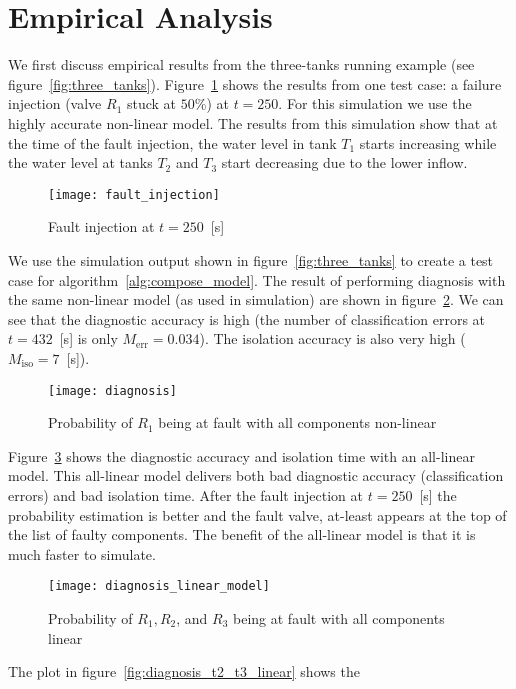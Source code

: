 \section{Empirical Analysis}
%
We first discuss empirical results from the three-tanks running
example (see
figure~\ref{fig:three_tanks}). Figure~\ref{fig:fault_injection} shows
the results from one test case: a failure injection (valve $R_1$ stuck
at $50$\%) at $t = 250$. For this simulation we use the highly accurate
non-linear model. The results from this simulation show that at the
time of the fault injection, the water level in tank $T_1$ starts
increasing while the water level at tanks $T_2$ and $T_3$ start
decreasing due to the lower inflow.
%
\begin{figure}[htb]
  \centering
  \texttt{[image: fault\_injection]}
  \caption{Fault injection at $t = 250$~[s]}
  \label{fig:fault_injection}
\end{figure}
\par
%
We use the simulation output shown in figure~\ref{fig:three_tanks} to
create a test case for algorithm~\ref{alg:compose_model}. The result
of performing diagnosis with the same non-linear model (as used in
simulation) are shown in figure~\ref{fig:diagnosis1}. We can see that
the diagnostic accuracy is high (the number of classification errors
at $t = 432$~[s] is only $M_{\mathrm{err}} = 0.034$). The isolation
accuracy is also very high ($M_{\mathrm{iso}} = 7$~[s]).
%
\begin{figure}[htb]
  \centering
  \texttt{[image: diagnosis]}
  \caption{Probability of $R_1$ being at fault with all components non-linear}
  \label{fig:diagnosis1}
\end{figure}
\par
%
Figure~\ref{fig:diagnosis} shows the diagnostic accuracy and isolation
time with an all-linear model. This all-linear model delivers both bad
diagnostic accuracy (classification errors) and bad isolation
time. After the fault injection at $t = 250$~[s] the probability
estimation is better and the fault valve, at-least appears at the top
of the list of faulty components. The benefit of the all-linear model
is that it is much faster to simulate.
%
\begin{figure}[htb]
  \centering
  \texttt{[image: diagnosis\_linear\_model]}
  \caption{Probability of $R_1, R_2$, and $R_3$ being at fault with all components linear}
  \label{fig:diagnosis}
\end{figure}
\par
%
The plot in figure~\ref{fig:diagnosis_t2_t3_linear} shows the
